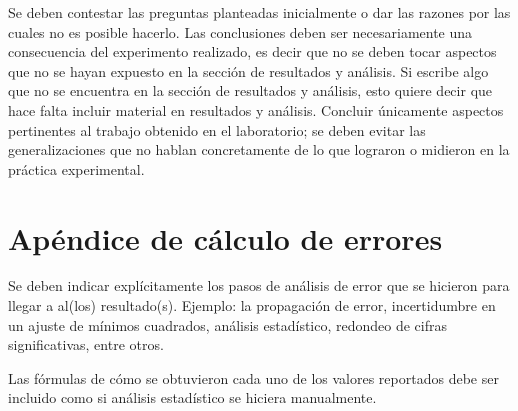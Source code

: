 \documentclass[a4paper, amsfonts, amssymb, amsmath, reprint, showkeys, nofootinbib, twoside]{revtex4-1}
\begin{document}
Se deben contestar las preguntas planteadas inicialmente o dar las razones por las cuales no es posible hacerlo.\cite{blaschke_physics_2001} Las conclusiones deben ser necesariamente una consecuencia del experimento realizado, es  decir  que  no  se  deben  tocar  aspectos  que  no  se  hayan  expuesto  en  la  sección  de resultados y análisis.\cite{kaspi_victoria_2016} Si escribe algo que no se encuentra en la sección de resultados y análisis,  esto quiere decir que hace falta incluir material en resultados y análisis. Concluir únicamente aspectos pertinentes al trabajo obtenido en el laboratorio; se deben evitar las generalizaciones que no hablan concretamente de lo que lograron o midieron en la práctica experimental.\cite{lattimer_physics_2004} 





\nocite{blaschke_physics_2001}

\section*{Apéndice de cálculo de errores}

Se deben indicar explícitamente los pasos de análisis de error que se hicieron para llegar a al(los) resultado(s). Ejemplo: la propagación de error, incertidumbre en un ajuste de mínimos cuadrados, análisis estadístico, redondeo de cifras significativas, entre otros.

Las fórmulas de cómo se obtuvieron cada uno de los valores reportados debe ser incluido como si análisis estadístico se hiciera manualmente.
\end{document}
